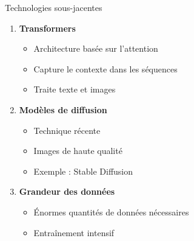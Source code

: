 \begin{frame}{Technologies sous-jacentes}

\begin{enumerate}
    \item<+-> \textbf{Transformers}
        \begin{itemize}
            \item Architecture basée sur l'attention
            \item Capture le contexte dans les séquences
            \item Traite texte et images
        \end{itemize}

    \vspace{0.2cm}
    \item<+-> \textbf{Modèles de diffusion}
        \begin{itemize}
            \item Technique récente
            \item Images de haute qualité
            \item Exemple : Stable Diffusion
        \end{itemize}

    \vspace{0.2cm}
    \item<+-> \textbf{Grandeur des données}
        \begin{itemize}
            \item Énormes quantités de données nécessaires
            \item Entraînement intensif
        \end{itemize}
\end{enumerate}

\end{frame}

